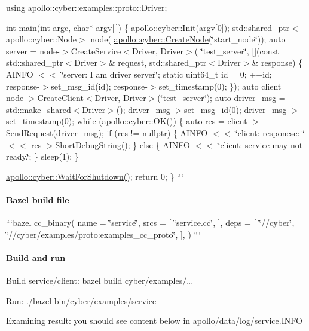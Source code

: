 using apollo\-::cyber\-::examples\-::proto\-::\-Driver;

int main(int argc, char$\ast$ argv\mbox{[}$\,$\mbox{]}) \{ apollo\-::cyber\-::\-Init(argv\mbox{[}0\mbox{]}); std\-::shared\-\_\-ptr$<$apollo\-::cyber\-::\-Node$>$ node( \hyperlink{namespaceapollo_1_1cyber_ae369c5de0279f2a5745d0438d532bc89}{apollo\-::cyber\-::\-Create\-Node}(\char`\"{}start\-\_\-node\char`\"{})); auto server = node-\/$>$Create\-Service$<$\-Driver, Driver$>$( \char`\"{}test\-\_\-server\char`\"{}, \mbox{[}\mbox{]}(const std\-::shared\-\_\-ptr$<$\-Driver$>$\& request, std\-::shared\-\_\-ptr$<$\-Driver$>$\& response) \{ A\-I\-N\-F\-O $<$$<$ \char`\"{}server\-: I am driver server\char`\"{}; static uint64\-\_\-t id = 0; ++id; response-\/$>$set\-\_\-msg\-\_\-id(id); response-\/$>$set\-\_\-timestamp(0); \}); auto client = node-\/$>$Create\-Client$<$\-Driver, Driver$>$(\char`\"{}test\-\_\-server\char`\"{}); auto driver\-\_\-msg = std\-::make\-\_\-shared$<$\-Driver$>$(); driver\-\_\-msg-\/$>$set\-\_\-msg\-\_\-id(0); driver\-\_\-msg-\/$>$set\-\_\-timestamp(0); while (\hyperlink{namespaceapollo_1_1cyber_aafa5f9962b51918897897bbc0fdd802f}{apollo\-::cyber\-::\-O\-K()}) \{ auto res = client-\/$>$Send\-Request(driver\-\_\-msg); if (res != nullptr) \{ A\-I\-N\-F\-O $<$$<$ \char`\"{}client\-: responese\-: \char`\"{} $<$$<$ res-\/$>$Short\-Debug\-String(); \} else \{ A\-I\-N\-F\-O $<$$<$ \char`\"{}client\-: service may not ready.\char`\"{}; \} sleep(1); \}

\hyperlink{namespaceapollo_1_1cyber_a7929114e78a9c595b0ee715968ca2712}{apollo\-::cyber\-::\-Wait\-For\-Shutdown()}; return 0; \} ``` \paragraph*{Bazel build file}

```bazel cc\-\_\-binary( name = \char`\"{}service\char`\"{}, srcs = \mbox{[} \char`\"{}service.\-cc\char`\"{}, \mbox{]}, deps = \mbox{[} \char`\"{}//cyber\char`\"{}, \char`\"{}//cyber/examples/proto\-:examples\-\_\-cc\-\_\-proto\char`\"{}, \mbox{]}, ) ```

\paragraph*{Build and run}


\begin{DoxyItemize}
\item Build service/client\-: bazel build cyber/examples/…
\item Run\-: ./bazel-\/bin/cyber/examples/service
\item Examining result\-: you should see content below in apollo/data/log/service.\-I\-N\-F\-O
\end{DoxyItemize}

